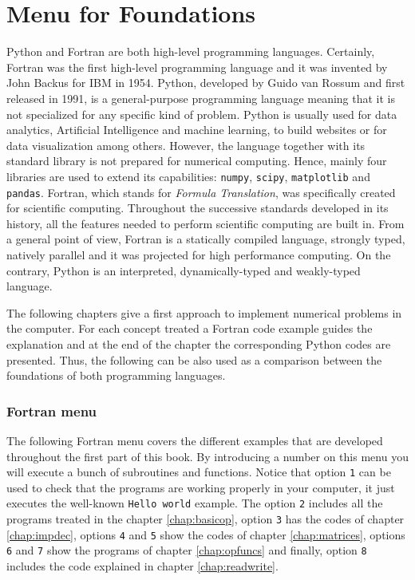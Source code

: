 
\chapter*{Menu for Foundations}
\vspace{-2.5cm}
Python and Fortran are both high-level programming languages. 
Certainly, Fortran was the first high-level programming language and it was invented by John Backus for IBM in 1954.
Python, developed by Guido van Rossum and first released in 1991, is a general-purpose programming language
meaning that it is not specialized for any specific kind of problem.
Python is usually used for data analytics, Artificial Intelligence and machine learning, to build websites or for data visualization among others. 
However, the language together with its standard library is not prepared for numerical computing.
Hence, mainly four libraries are used to extend its capabilities: \texttt{numpy}, \texttt{scipy}, \texttt{matplotlib} and \texttt{pandas}. 
Fortran, which stands for \textit{Formula Translation}, was specifically created for scientific computing.
Throughout the successive standards developed in its history, all the features needed to perform scientific computing are built in. 
From a general point of view, Fortran is a statically compiled language, strongly typed, natively parallel and it was projected for high performance computing.
On the contrary, Python is an interpreted, dynamically-typed and weakly-typed language.

The following chapters give a first approach to implement numerical 
problems in the computer.
For each concept treated a Fortran code example guides the explanation and at the 
end of the chapter the corresponding Python codes are presented. Thus, the following
can be also used as a comparison between the foundations of both programming languages.  


    \vspace{-0.3cm}
    \subsection*{Fortran menu}
    \vspace{-0.3cm}
The following Fortran menu covers the different examples that are developed throughout the first part of this book.
By introducing a number on this menu you will execute a bunch of subroutines and functions. 
Notice that option \texttt{1} can be used to check that the programs are working properly in your computer, it just executes the well-known \texttt{Hello world} example. 
The option \texttt{2} includes all the programs treated in the chapter \ref{chap:basicop}, 
option \texttt{3} has the codes of chapter \ref{chap:impdec},
options \texttt{4} and \texttt{5} show the codes of chapter \ref{chap:matrices},
options \texttt{6} and \texttt{7} show the programs of chapter \ref{chap:opfuncs} and finally,
option \texttt{8} includes the code explained in chapter \ref{chap:readwrite}.

